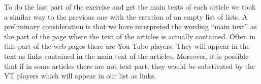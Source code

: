 \documentclass[
]{article}
\newenvironment{Shaded}{\begin{snugshade}}{\end{snugshade}}
\newcommand{\ControlFlowTok}[1]{\textcolor[rgb]{0.13,0.29,0.53}{\textbf{#1}}}
\newcommand{\DataTypeTok}[1]{\textcolor[rgb]{0.13,0.29,0.53}{#1}}
\newcommand{\DecValTok}[1]{\textcolor[rgb]{0.00,0.00,0.81}{#1}}
\newcommand{\KeywordTok}[1]{\textcolor[rgb]{0.13,0.29,0.53}{\textbf{#1}}}
\newcommand{\NormalTok}[1]{#1}
\newcommand{\OperatorTok}[1]{\textcolor[rgb]{0.81,0.36,0.00}{\textbf{#1}}}
\newcommand{\StringTok}[1]{\textcolor[rgb]{0.31,0.60,0.02}{#1}}
\begin{document}
\begin{Shaded}
\end{Shaded}

To do the last part of the exercise and get the main texts of each
article we took a similar way to the previous one with the creation of
an empty list of lists. A preliminary consideration is that we have
interpreted the wording ``main text'' as the part of the page where the
text of the articles is actually contained. Often in this part of the
web pages there are You Tube players. They will appear in the text as
links contained in the main text of the articles. Moreover, it is
possible that if in some articles there are not text part, they would be
substituted by the YT players which will appear in our list as links.
\end{document}
